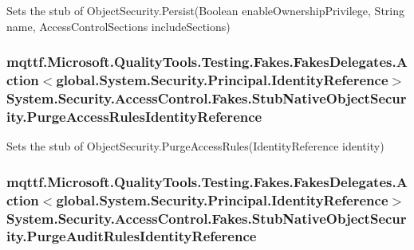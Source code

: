 Sets the stub of Object\-Security.\-Persist(\-Boolean enable\-Ownership\-Privilege, String name, Access\-Control\-Sections include\-Sections)

\hypertarget{class_system_1_1_security_1_1_access_control_1_1_fakes_1_1_stub_native_object_security_aec018d3a80a5b4fe8eb5d084818fd75b}{
\subsubsection[{Purge\-Access\-Rules\-Identity\-Reference}]{\setlength{\rightskip}{0pt plus 5cm}mqttf.\-Microsoft.\-Quality\-Tools.\-Testing.\-Fakes.\-Fakes\-Delegates.\-Action$<$global.\-System.\-Security.\-Principal.\-Identity\-Reference$>$ System.\-Security.\-Access\-Control.\-Fakes.\-Stub\-Native\-Object\-Security.\-Purge\-Access\-Rules\-Identity\-Reference}}\label{class_system_1_1_security_1_1_access_control_1_1_fakes_1_1_stub_native_object_security_aec018d3a80a5b4fe8eb5d084818fd75b}


Sets the stub of Object\-Security.\-Purge\-Access\-Rules(\-Identity\-Reference identity)

\hypertarget{class_system_1_1_security_1_1_access_control_1_1_fakes_1_1_stub_native_object_security_a9a32e4467378a6e8eb43b2591f36766b}{
\subsubsection[{Purge\-Audit\-Rules\-Identity\-Reference}]{\setlength{\rightskip}{0pt plus 5cm}mqttf.\-Microsoft.\-Quality\-Tools.\-Testing.\-Fakes.\-Fakes\-Delegates.\-Action$<$global.\-System.\-Security.\-Principal.\-Identity\-Reference$>$ System.\-Security.\-Access\-Control.\-Fakes.\-Stub\-Native\-Object\-Security.\-Purge\-Audit\-Rules\-Identity\-Reference}}\label{class_system_1_1_security_1_1_access_control_1_1_fakes_1_1_stub_native_object_security_a9a32e4467378a6e8eb43b2591f36766b}


